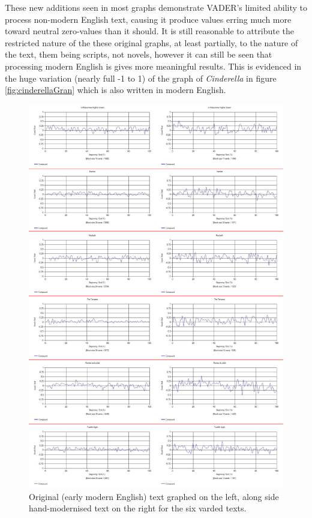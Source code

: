\documentclass{article}
\begin{document}
        These new additions seen in most graphs demonstrate VADER's limited ability to process non-modern English text, causing it produce values erring much more toward neutral zero-values than it should. It is still reasonable to attribute the restricted nature of the these original graphs, at least partially, to the nature of the text, them being scripts, not novels, however it can still be seen that processing modern English is gives more meaningful results. This is evidenced in the huge variation (nearly full -1 to 1) of the graph of \textit{Cinderella} in figure \ref{fig:cinderellaGran} which is also written in modern English.
        \begin{figure}
            \includegraphics[width=1\textwidth]{Figures/EMvsM/EMvsMAll}
            \centering
            \caption{Original (early modern English) text graphed on the left, along side hand-modernised text on the right for the six varded texts.}
            \label{fig:emvsm}
        \end{figure}
\end{document}
